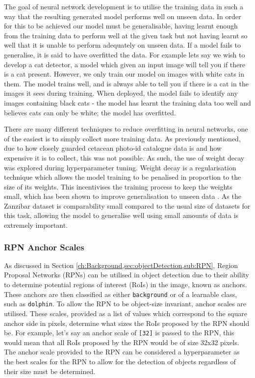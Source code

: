 The goal of neural network development is to utilise the training data in such a way that the resulting generated model performs well on unseen data. In order for this to be achieved our model must be generalisable, having learnt enough from the training data to perform well at the given task but not having learnt so well that it is unable to perform adequately on unseen data. If a model fails to generalise, it is said to have overfitted the data. For example lets say we wish to develop a cat detector, a model which given an input image will tell you if there is a cat present. However, we only train our model on images with white cats in them. The model trains well, and is always able to tell you if there is a cat in the images it sees during training. When deployed, the model fails to identify any images containing black cats - the model has learnt the training data too well and believes cats can only be white; the model has overfitted. 

There are many different techniques to reduce overfitting in neural networks, one of the easiest is to simply collect more training data. As previously mentioned, due to how closely guarded cetacean photo-id catalogue data is and how expensive it is to collect, this was not possible. As such, the use of weight decay was explored during hyperparameter tuning. Weight decay is a regularisation technique which allows the model training to be penalised in proportion to the size of its weights. This incentivises the training process to keep the weights small, which has been shown to improve generalisation to unseen data \cite{krogh_simple_1991}. As the Zanzibar dataset is comparability small compared to the usual size of datasets for this task, allowing the model to generalise well using small amounts of data is extremely important.

\subsubsection{RPN Anchor Scales}\label{ch:cetDet,sec:ModelSelection,sub:TrainingHyperparameters,subsub:RPNAnchorScales}

As discussed in Section \ref{ch:Background,sec:objectDetection,sub:RPN}, Region Proposal Networks (RPNs) can be utilised in object detection due to their ability to determine potential regions of interest (RoIs) in the image, known as anchors. These anchors are then classified as either \texttt{background} or of a learnable class, such as \texttt{dolphin}. To allow the RPN to be object-size invariant, anchor scales are utilised. These scales, provided as a list of values which correspond to the square anchor side in pixels, determine what sizes the RoIs proposed by the RPN should be. For example, let's say an anchor scale of \texttt{[32]} is passed to the RPN, this would mean that all RoIs proposed by the RPN would be of size 32x32 pixels. The anchor scale provided to the RPN can be considered a hyperparameter as the best scales for the RPN to allow for the detection of objects regardless of their size must be determined. 

